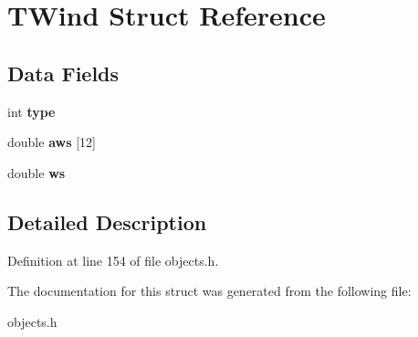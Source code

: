 \hypertarget{struct_t_wind}{}\section{T\+Wind Struct Reference}
\label{struct_t_wind}
\subsection*{Data Fields}
\begin{DoxyCompactItemize}
\item 
\mbox{\label{struct_t_wind_ac765329451135abec74c45e1897abf26}} 
int {\bfseries type}
\item 
\mbox{\label{struct_t_wind_a16e7938c92c44c12948cea498d311af7}} 
double {\bfseries aws} \mbox{[}12\mbox{]}
\item 
\mbox{\label{struct_t_wind_acc82115cf9398be54353263fb8acde84}} 
double {\bfseries ws}
\end{DoxyCompactItemize}


\subsection{Detailed Description}


Definition at line 154 of file objects.\+h.



The documentation for this struct was generated from the following file\+:\begin{DoxyCompactItemize}
\item 
objects.\+h\end{DoxyCompactItemize}
